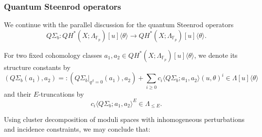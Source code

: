 \documentclass[reqno]{amsart}
\numberwithin{equation}{section}
\numberwithin{equation}{section}
\numberwithin{equation}{section}
\theoremstyle{definition}
\theoremstyle{remark}
\theoremstyle{remark}
\newtheorem{rem}[thm]{Remark}
\begin{document}


\subsubsection{Quantum Steenrod operators}
We continue with the parallel discussion for the quantum Steenrod operators
\begin{equation}
    Q\Sigma_b : QH^*(X;\Lambda_{\mathbb{F}_p})[u]\langle \theta \rangle \to QH^*(X;\Lambda_{\mathbb{F}_p})[u]\langle \theta \rangle.
\end{equation}

For two fixed cohomology classes $a_1, a_2 \in QH^*(X;\Lambda_{\mathbb{F}_p})[u]\langle \theta \rangle$, we denote its structure constants by
\begin{equation}
  \left( Q\Sigma_b(a_1), a_2 \right) =:  \left( Q\Sigma_b|_{q^\beta = 0}(a_1), a_2 \right) +  \sum_{i \ge 0} c_i \langle  Q\Sigma_b; a_1, a_2 \rangle (u, \theta)^i \in \Lambda[u]\langle \theta \rangle
\end{equation}
and their $E$-truncations by
\begin{equation}
    c_i \langle  Q\Sigma_b; a_1, a_2 \rangle^E  \in \Lambda_{\le E}.
\end{equation}

Using cluster decomposition of moduli spaces with inhomogeneous perturbations and incidence constraints, we may conclude that:
\end{document}
